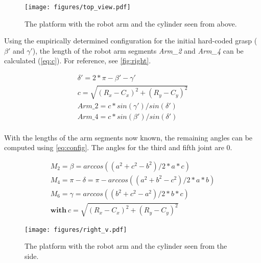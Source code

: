 \begin{figure}[htpb]
\centering
	\texttt{[image: figures/top\_view.pdf]} 
	\caption{The platform with the robot arm and the cylinder seen from above.}
	\label{fig:top}
\end{figure}

Using the empirically determined configuration for the initial hard-coded grasp ($\beta'$ and $\gamma'$), the length of the robot arm segments \textit{Arm\_2} and \textit{Arm\_4} can be calculated (\autoref{eq:c}).
For reference, see \autoref{fig:right}.

\begin{equation}
\begin{aligned}
\delta'=2*\pi-\beta'-\gamma'\\
c=\sqrt{(R_x-C_x)^2+(R_y-C_y)^2}\\
\textit{Arm\_2}=c*sin(\gamma')/sin(\delta')\\
\textit{Arm\_4}=c*sin(\beta')/sin(\delta')\\
\label{eq:c}
\end{aligned}
\end{equation}

With the lengths of the arm segments now known, the remaining angles can be computed using \autoref{eq:config}.
The angles for the third and fifth joint are $0$.

\begin{equation}
\label{eq:config}
\begin{aligned}
M_2=\beta=arccos((a^2+c^2-b^2)/2*a*c)\\
M_4=\pi-\delta=\pi-arccos((a^2+b^2-c^2)/2*a*b)\\
M_6=\gamma=arccos((b^2+c^2-a^2)/2*b*c)\\
\textbf{with}\ c=\sqrt{(R_x-C_x)^2+(R_y-C_y)^2}
\end{aligned}
\end{equation}

\begin{figure}[tpb]
\centering
	\texttt{[image: figures/right\_v.pdf]} 
	\caption{The platform with the robot arm and the cylinder seen from the side.}
	\label{fig:right}
\end{figure}



